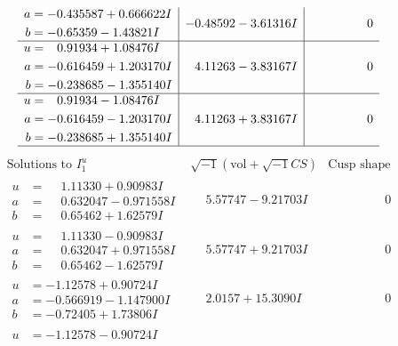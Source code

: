 \documentclass[1p]{elsarticle_modified}
\theoremstyle{definition}
\newcommand{\I}{\sqrt{-1}}
\begin{document}
$$\begin{array}{c|c|c}
\begin{aligned}
a &= -0.435587 + 0.666622 I \\
b &= -0.65359 - 1.43821 I\end{aligned}
 & -0.48592 - 3.61316 I & \phantom{-0.000000 } 0 \\ \hline\begin{aligned}
u &= \phantom{-}0.91934 + 1.08476 I \\
a &= -0.616459 + 1.203170 I \\
b &= -0.238685 - 1.355140 I\end{aligned}
 & \phantom{-}4.11263 - 3.83167 I & \phantom{-0.000000 } 0 \\ \hline\begin{aligned}
u &= \phantom{-}0.91934 - 1.08476 I \\
a &= -0.616459 - 1.203170 I \\
b &= -0.238685 + 1.355140 I\end{aligned}
 & \phantom{-}4.11263 + 3.83167 I & \phantom{-0.000000 } 0\\
 \hline 
 \end{array}$$\newpage$$\begin{array}{c|c|c}  
\text{Solutions to }I^u_{1}& \I (\text{vol} + \sqrt{-1}CS) & \text{Cusp shape}\\
 \hline 
\begin{aligned}
u &= \phantom{-}1.11330 + 0.90983 I \\
a &= \phantom{-}0.632047 - 0.971558 I \\
b &= \phantom{-}0.65462 + 1.62579 I\end{aligned}
 & \phantom{-}5.57747 - 9.21703 I & \phantom{-0.000000 } 0 \\ \hline\begin{aligned}
u &= \phantom{-}1.11330 - 0.90983 I \\
a &= \phantom{-}0.632047 + 0.971558 I \\
b &= \phantom{-}0.65462 - 1.62579 I\end{aligned}
 & \phantom{-}5.57747 + 9.21703 I & \phantom{-0.000000 } 0 \\ \hline\begin{aligned}
u &= -1.12578 + 0.90724 I \\
a &= -0.566919 - 1.147900 I \\
b &= -0.72405 + 1.73806 I\end{aligned}
 & \phantom{-}2.0157 + 15.3090 I & \phantom{-0.000000 } 0 \\ \hline\begin{aligned}
u &= -1.12578 - 0.90724 I \\

\end{aligned}
\end{array}$$
\end{document}
